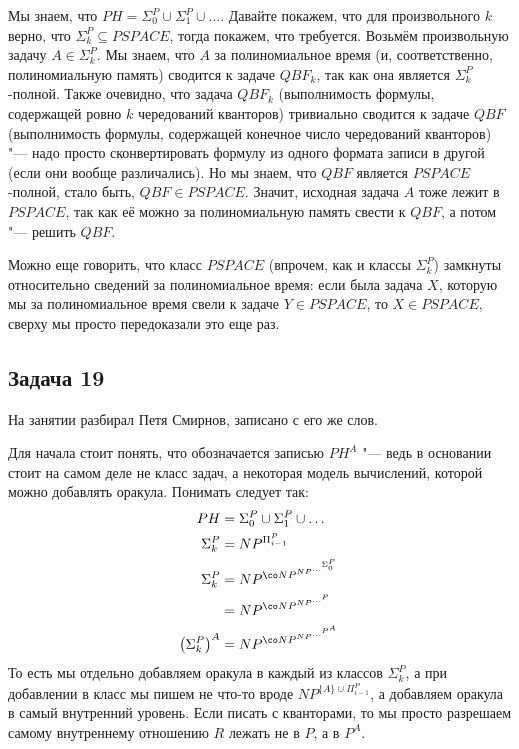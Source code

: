 	Мы знаем, что $PH=\Sigma_0^P\cup\Sigma_1^P\cup\dots$.
	Давайте покажем, что для произвольного $k$ верно, что $\Sigma_k^P \subseteq PSPACE$, тогда покажем, что требуется.
	Возьмём произвольную задачу $A \in \Sigma_k^P$.
	Мы знаем, что $A$ за полиномиальное время (и, соответственно, полиномиальную память) сводится к задаче $QBF_k$, так как она является $\Sigma_k^P$-полной.
	Также очевидно, что задача $QBF_k$ (выполнимость формулы, содержащей ровно $k$ чередований кванторов) тривиально сводится к задаче $QBF$
	(выполнимость формулы, содержащей конечное число чередований кванторов) "--- надо просто сконвертировать формулу из одного формата записи в другой (если они вообще различались).
	Но мы знаем, что $QBF$ является $PSPACE$-полной, стало быть, $QBF \in PSPACE$.
	Значит, исходная задача $A$ тоже лежит в $PSPACE$, так как её можно за полиномиальную память свести к $QBF$, а потом "--- решить $QBF$.

	\begin{Rem}
		Можно еще говорить, что класс $PSPACE$ (впрочем, как и классы $\Sigma_k^P$) замкнуты относительно сведений за полиномиальное время:
		если была задача $X$, которую мы за полиномиальное время свели к задаче $Y\in PSPACE$, то $X \in PSPACE$, сверху мы просто
		передоказали это еще раз.
	\end{Rem}

\subsection{Задача 19}
	На занятии разбирал Петя Смирнов, записано с его же слов.

	\begin{Rem}
		Для начала стоит понять, что обозначается записью $PH^A$ "--- ведь в основании стоит на самом деле не класс задач, а некоторая
		модель вычислений, которой можно добавлять оракула.
		Понимать следует так:
		\begin{align*}
			PH &= \Sigma_0^P \cup \Sigma_1^P \cup \dots \\
			\Sigma_k^P &= NP^{\Pi_{i-1}^P} \\
			\Sigma_k^P
				&= NP^{\co NP^{NP^{\dots^{\Sigma_0^P}}}} \\
				&= NP^{\co NP^{NP^{\dots^{P}}}} \\
			\left(\Sigma_k^P\right)^A
				&= NP^{\co NP^{NP^{\dots^{P^A}}}}
		\end{align*}
		То есть мы отдельно добавляем оракула в каждый из классов $\Sigma_k^P$, а при добавлении в класс мы пишем не
		что-то вроде $NP^{\{A\}\cup \Pi_{i-1}^P}$, а добавляем оракула в самый внутренний уровень.
		Если писать с кванторами, то мы просто разрешаем самому внутреннему отношению $R$ лежать не в $P$, а в $P^A$.
	\end{Rem}

